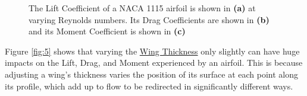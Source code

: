 \documentclass{article}
\begin{document}
\begin{figure}[!htb]
  \centering
  \caption{The Lift Coefficient of a NACA 1115 airfoil is shown in \textbf{(a)} at varying Reynolds numbers. Its Drag Coefficients are shown in \textbf{(b)} and its Moment Coefficient is shown in \textbf{(c)}}
  \label{fig:4}
\end{figure}

Figure \ref{fig:5} shows that varying the \hyperlink{Th}{Wing Thickness} only slightly can have huge impacts on the Lift, Drag, and Moment experienced by an airfoil. This is because adjusting a wing's thickness varies the position of its surface at each point along its profile, which add up to flow to be redirected in significantly different ways.
\end{document}

